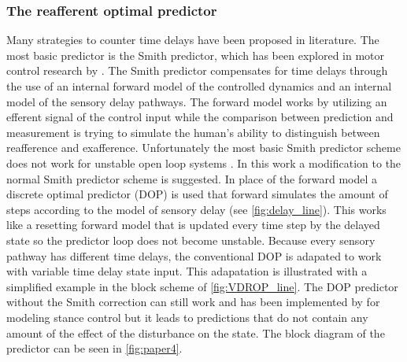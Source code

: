 \subsubsection{The reafferent optimal predictor}
Many strategies to counter time delays have been proposed in literature. The most basic predictor is the Smith predictor, which has been explored in motor control research by \citet{miall1993cerebellum}. The Smith predictor compensates for time delays through the use of an internal forward model of the controlled dynamics and an internal model of the sensory delay pathways. The forward model works by utilizing an efferent signal of the control input while the comparison between prediction and measurement is trying to simulate the human's ability to distinguish between reafference and exafference.  Unfortunately the  most basic Smith predictor scheme does not work for unstable open loop systems \cite{smith1957closed}. In this work a modification to the normal Smith predictor scheme is suggested. In place of the forward model a discrete optimal predictor  (DOP) is used that forward simulates the amount of steps according to the model of sensory delay (see \cref{fig:delay_line}). This works like a resetting forward model that is updated every time step by the delayed state so the predictor loop does not become unstable. Because every sensory pathway has different time delays, the conventional DOP is adapated to work with variable time delay state input. This adapatation is illustrated with a simplified example in the block scheme of \cref{fig:VDROP_line}.  The DOP predictor  without the Smith  correction can still work and has been implemented by \citet{van2001adaptive} for modeling stance control but it leads to predictions that do not contain any amount of the effect of the disturbance on the state. The block diagram of the predictor can be seen in \cref{fig:paper4}.

